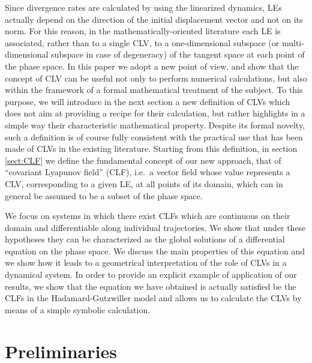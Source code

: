 \documentclass{article}
\theoremstyle{plain}
\theoremstyle{definition}
\theoremstyle{remark}
\begin{document}
Since divergence rates are calculated by
using the linearized dynamics, LEs actually depend on the direction of
the initial displacement vector and not on its norm. For this reason,
in the mathematically-oriented
literature each LE is associated, rather than to a single CLV,
to a one-dimensional subspace (or multi-dimensional subspace
in case of degeneracy) of the tangent space at each point of the phase
space.
 In this paper we adopt a new point of view, and show that the concept of CLV
 can be useful not only to perform numerical calculations, but
also within the framework of a formal mathematical treatment of the
 subject. To this purpose, we
will introduce in the next section a new definition of CLVs
which does not aim at providing a recipe for their calculation, but rather
highlights in a simple way their characteristic mathematical property.
Despite its formal novelty, such a definition is of course
fully consistent with the practical use that has
been made of CLVs in the existing literature. 
Starting from this definition, in
section \ref{sect:CLF} we define the fundamental concept of our new
approach, that of ``covariant Lyapunov field'' (CLF), i.e.\ a vector
field whose value represents a CLV, corresponding to a given LE, at
all points of its domain, which can in general be assumed to be a
subset of the phase space.  

We focus on systems in which there exist
CLFs which are continuous on their domain and differentiable along
individual trajectories. We show that under these hypotheses they can
be characterized as the global solutions of a differential equation on
the phase space.  We discuss the main properties of this equation and
we show how it leads to a geometrical interpretation of the role of
CLVs in a dynamical system.  In order to provide an explicit example
of application of our results, we show that the equation we have
obtained is actually satisfied be the CLFs in the Hadamard-Gutzwiller
model and allows us to calculate the CLVs by means of a simple
symbolic calculation.

\section{Preliminaries}
\end{document}
